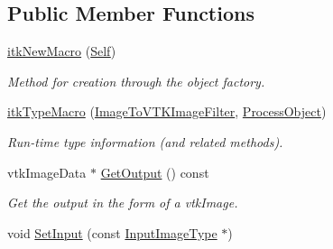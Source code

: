 \subsection*{Public Member Functions}
\begin{DoxyCompactItemize}
\item 
\hyperlink{classitk_1_1_image_to_v_t_k_image_filter_aa710a87cb782de6debe331a86646f7b0}{itkNewMacro} (\hyperlink{classitk_1_1_image_to_v_t_k_image_filter}{Self})
\begin{DoxyCompactList}\small\item\em Method for creation through the object factory. \item\end{DoxyCompactList}\item 
\hyperlink{classitk_1_1_image_to_v_t_k_image_filter_a2660682c96fa14496eaff4226d9d6f38}{itkTypeMacro} (\hyperlink{classitk_1_1_image_to_v_t_k_image_filter}{ImageToVTKImageFilter}, \hyperlink{class_process_object}{ProcessObject})
\begin{DoxyCompactList}\small\item\em Run-\/time type information (and related methods). \item\end{DoxyCompactList}\item 
vtkImageData $\ast$ \hyperlink{classitk_1_1_image_to_v_t_k_image_filter_ac97a69a27292b89146503bac2182cd76}{GetOutput} () const 
\begin{DoxyCompactList}\small\item\em Get the output in the form of a vtkImage. \item\end{DoxyCompactList}\item 
\hypertarget{classitk_1_1_image_to_v_t_k_image_filter_a6cab58f7167a357889763a2412d6a9e5}{
void \hyperlink{classitk_1_1_image_to_v_t_k_image_filter_a6cab58f7167a357889763a2412d6a9e5}{SetInput} (const \hyperlink{classitk_1_1_image_to_v_t_k_image_filter_a4676ef1161730b61cddaf6ac892662f3}{InputImageType} $\ast$)}
\label{classitk_1_1_image_to_v_t_k_image_filter_a6cab58f7167a357889763a2412d6a9e5}


\end{DoxyCompactItemize}
